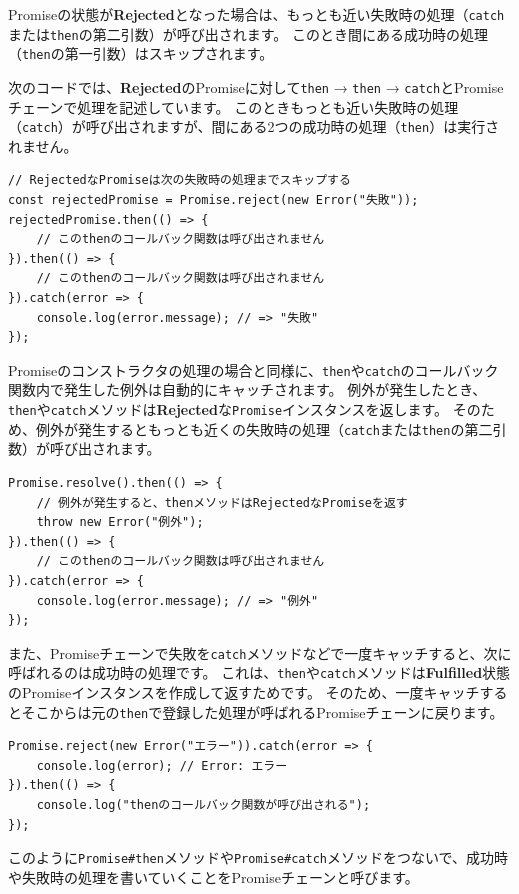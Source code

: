 Promiseの状態が\textbf{Rejected}となった場合は、もっとも近い失敗時の処理（\texttt{catch}または\texttt{then}の第二引数）が呼び出されます。
このとき間にある成功時の処理（\texttt{then}の第一引数）はスキップされます。

次のコードでは、\textbf{Rejected}のPromiseに対して\texttt{then}
→ \texttt{then} →
\texttt{catch}とPromiseチェーンで処理を記述しています。
このときもっとも近い失敗時の処理（\texttt{catch}）が呼び出されますが、間にある2つの成功時の処理（\texttt{then}）は実行されません。

\begin{lstlisting}
// RejectedなPromiseは次の失敗時の処理までスキップする
const rejectedPromise = Promise.reject(new Error("失敗"));
rejectedPromise.then(() => {
    // このthenのコールバック関数は呼び出されません
}).then(() => {
    // このthenのコールバック関数は呼び出されません
}).catch(error => {
    console.log(error.message); // => "失敗"
});
\end{lstlisting}

Promiseのコンストラクタの処理の場合と同様に、\texttt{then}や\texttt{catch}のコールバック関数内で発生した例外は自動的にキャッチされます。
例外が発生したとき、\texttt{then}や\texttt{catch}メソッドは\textbf{Rejected}な\texttt{Promise}インスタンスを返します。
そのため、例外が発生するともっとも近くの失敗時の処理（\texttt{catch}または\texttt{then}の第二引数）が呼び出されます。

\begin{lstlisting}
Promise.resolve().then(() => { 
    // 例外が発生すると、thenメソッドはRejectedなPromiseを返す
    throw new Error("例外");
}).then(() => {
    // このthenのコールバック関数は呼び出されません
}).catch(error => {
    console.log(error.message); // => "例外"
});
\end{lstlisting}

また、Promiseチェーンで失敗を\texttt{catch}メソッドなどで一度キャッチすると、次に呼ばれるのは成功時の処理です。
これは、\texttt{then}や\texttt{catch}メソッドは\textbf{Fulfilled}状態のPromiseインスタンスを作成して返すためです。
そのため、一度キャッチするとそこからは元の\texttt{then}で登録した処理が呼ばれるPromiseチェーンに戻ります。

\begin{lstlisting}
Promise.reject(new Error("エラー")).catch(error => {
    console.log(error); // Error: エラー
}).then(() => {
    console.log("thenのコールバック関数が呼び出される");
});
\end{lstlisting}

このように\texttt{Promise\#then}メソッドや\texttt{Promise\#catch}メソッドをつないで、成功時や失敗時の処理を書いていくことをPromiseチェーンと呼びます。


